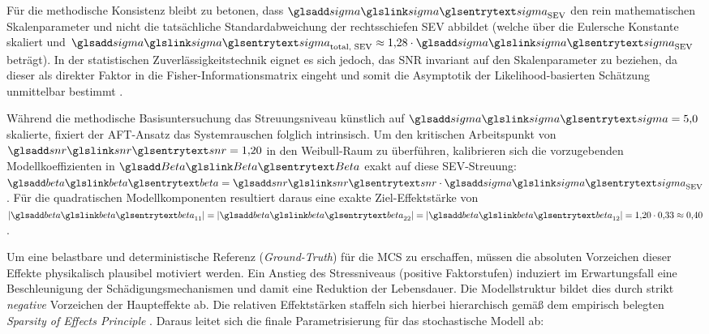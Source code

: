Für die methodische Konsistenz bleibt zu betonen, dass $\sym{sigma}_{\textnormal{SEV}}$ den rein mathematischen Skalenparameter und nicht die tatsächliche Standardabweichung der rechtsschiefen \ac{SEV} abbildet (welche über die Eulersche Konstante skaliert und $\sym{sigma}_{\textnormal{total, SEV}} \approx 1{,}28 \cdot \sym{sigma}_{\textnormal{SEV}}$ beträgt).
In der statistischen Zuverlässigkeitstechnik eignet es sich jedoch, das \ac{SNR} invariant auf den Skalenparameter zu beziehen, da dieser als direkter Faktor in die Fisher-Informationsmatrix eingeht und somit die Asymptotik der Likelihood-basierten Schätzung unmittelbar bestimmt \cite{Meeker.2022}.

Während die methodische Basisuntersuchung das Streuungsniveau künstlich auf $\sym{sigma} = 5{,}0$ skalierte, fixiert der \ac{AFT}-Ansatz das Systemrauschen folglich intrinsisch.
Um den kritischen Arbeitspunkt von $\sym{snr} = 1{,}20$ in den Weibull-Raum zu überführen, kalibrieren sich die vorzugebenden Modellkoeffizienten in $\sym{Beta}$ exakt auf diese \ac{SEV}-Streuung: $\sym{beta} = \sym{snr} \cdot \sym{sigma}_{\textnormal{SEV}}$.
Für die quadratischen Modellkomponenten resultiert daraus eine exakte Ziel-Effektstärke von $|\sym{beta}_{11}| = |\sym{beta}_{22}| = |\sym{beta}_{12}| = 1{,}20 \cdot 0{,}33 \approx 0{,}40$.

Um eine belastbare und deterministische Referenz (\textit{Ground-Truth}) für die \ac{MCS} zu erschaffen, müssen die absoluten Vorzeichen dieser Effekte physikalisch plausibel motiviert werden. Ein Anstieg des Stressniveaus (positive Faktorstufen) induziert im Erwartungsfall eine Beschleunigung der Schädigungsmechanismen und damit eine Reduktion der Lebensdauer. Die Modellstruktur bildet dies durch strikt \textit{negative} Vorzeichen der Haupteffekte ab. Die relativen Effektstärken staffeln sich hierbei hierarchisch gemäß dem empirisch belegten \textit{Sparsity of Effects Principle} \cite{Montgomery.2020}. Daraus leitet sich die finale Parametrisierung für das stochastische Modell ab:

